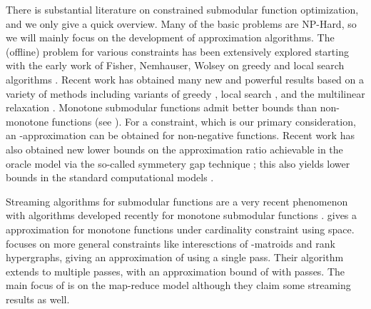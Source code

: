 \documentclass[oneside,letterpaper]{scrartcl} \usepackage{macros}
\begin{document}
There is substantial literature on constrained submodular function
optimization, and we only give a quick overview.  Many of the basic
problems are NP-Hard, so we will mainly focus on the development of
approximation algorithms.  The (offline) problem  for various constraints has been extensively
explored starting with the early work of Fisher, Nemhauser, Wolsey on
greedy and local search algorithms
\cite{nwf-mssf1-78,fnw-mssf2-78}. Recent work has obtained many new
and powerful results based on a variety of methods including variants
of greedy \cite{grst-10,bfns-smcc-14,bfjs-12}, local search
\cite{LeeMNS10,lsv-smmm-10,FilmusW14}, and the multilinear relaxation
\cite{ccpv-11,KulikST13,BansalKNS12,cvz-mrcrs-11}. Monotone submodular
functions admit better bounds than non-monotone functions (see
).  For a  constraint, which
is our primary consideration, an -approximation can be
obtained for non-negative functions. Recent work has also obtained new
lower bounds on the approximation ratio achievable in the oracle model
via the so-called symmetery gap technique \cite{Vondrak13}; this also
yields lower bounds in the standard computational models \cite{dv-12}.

Streaming algorithms for submodular functions are a very recent
phenomenon with algorithms developed recently for monotone submodular
functions \cite{bmkk-sso-14,ck-smms-14}. \cite{bmkk-sso-14} gives a
 approximation for monotone functions under cardinality
constraint using  space. \cite{ck-smms-14} focuses
on more general constraints like interesctions of -matroids and
rank  hypergraphs, giving an approximation of  using a single
pass. Their algorithm extends to multiple passes, with an
approximation bound of  with  passes.  The main focus of \cite{kmvv-13} is on the map-reduce
model although they claim some streaming results as well.
\end{document}
